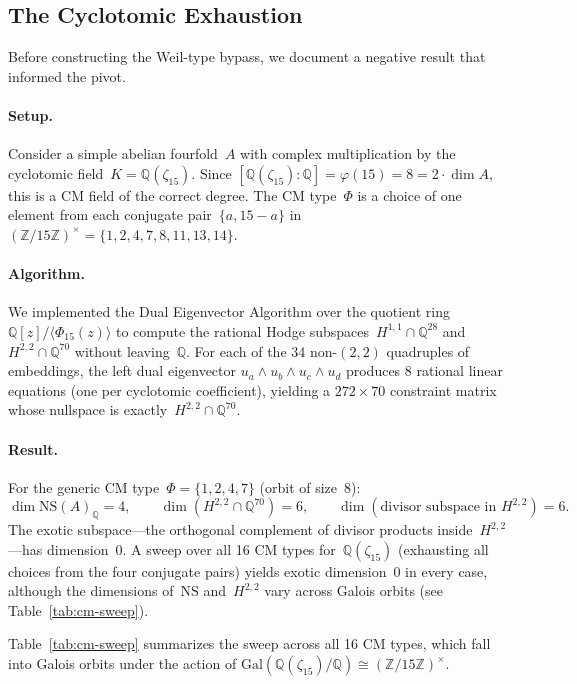 \documentclass[11pt]{article}
\theoremstyle{plain}
\theoremstyle{definition}
\theoremstyle{remark}
\newcommand{\Z}{\mathbb{Z}}
\newcommand{\Q}{\mathbb{Q}}
\newcommand{\Gal}{\mathrm{Gal}}
\newcommand{\NS}{\mathrm{NS}}
\begin{document}
\subsection{The Cyclotomic Exhaustion}
\label{sec:cyclotomic}

Before constructing the Weil-type bypass, we document a negative result that
informed the pivot.

\paragraph{Setup.}
Consider a simple abelian fourfold~$A$ with complex multiplication by the
cyclotomic field~$K = \Q(\zeta_{15})$.  Since $[\Q(\zeta_{15}):\Q]
= \varphi(15) = 8 = 2 \cdot \dim A$, this is a CM field of the correct
degree.  The CM type~$\Phi$ is a choice of one element from each conjugate
pair~$\{a, 15-a\}$ in~$(\Z/15\Z)^\times = \{1,2,4,7,8,11,13,14\}$.

\paragraph{Algorithm.}
We implemented the Dual Eigenvector Algorithm over the quotient
ring~$\Q[z]/\langle \Phi_{15}(z) \rangle$ to compute the rational Hodge
subspaces~$H^{1,1} \cap \Q^{28}$ and~$H^{2,2} \cap \Q^{70}$ without
leaving~$\Q$.  For each of the 34 non-$(2,2)$ quadruples of embeddings,
the left dual eigenvector $u_a \wedge u_b \wedge u_c \wedge u_d$ produces
8 rational linear equations (one per cyclotomic coefficient), yielding a
$272 \times 70$ constraint matrix whose nullspace is
exactly~$H^{2,2} \cap \Q^{70}$.

\paragraph{Result.}
For the generic CM type~$\Phi = \{1,2,4,7\}$ (orbit of size~8):
\[
  \dim \NS(A)_\Q = 4, \qquad
  \dim (H^{2,2} \cap \Q^{70}) = 6, \qquad
  \dim (\text{divisor subspace in } H^{2,2}) = 6.
\]
The exotic subspace---the orthogonal complement of divisor products
inside~$H^{2,2}$---has dimension~0.  A sweep over all 16 CM types
for~$\Q(\zeta_{15})$ (exhausting all choices from the four conjugate pairs)
yields exotic dimension~0 in every case, although the dimensions
of~$\NS$ and~$H^{2,2}$ vary across Galois orbits (see
Table~\ref{tab:cm-sweep}).

Table~\ref{tab:cm-sweep} summarizes the sweep across all 16 CM types,
which fall into Galois orbits under the action of
$\Gal(\Q(\zeta_{15})/\Q) \cong (\Z/15\Z)^\times$.
\end{document}
